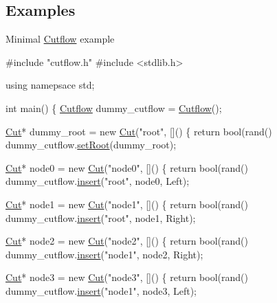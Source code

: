 \subsection*{Examples}


\begin{DoxyEnumerate}
\item Minimal \hyperlink{classCutflow}{Cutflow} example 
\begin{DoxyCode}
\textcolor{preprocessor}{#include "cutflow.h"}
\textcolor{preprocessor}{#include <stdlib.h>}

\textcolor{keyword}{using} namepsace std;

\textcolor{keywordtype}{int} main()
\{
    \hyperlink{classCutflow}{Cutflow} dummy\_cutflow = \hyperlink{classCutflow}{Cutflow}();

    \hyperlink{classCut}{Cut}* dummy\_root = \textcolor{keyword}{new} \hyperlink{classCut}{Cut}(\textcolor{stringliteral}{"root"}, []() \{ \textcolor{keywordflow}{return} bool(rand() %
    dummy\_cutflow.\hyperlink{classCutflow_ad27d37141c3748779a5d81fad919ecbb}{setRoot}(dummy\_root);

    \hyperlink{classCut}{Cut}* node0 = \textcolor{keyword}{new} \hyperlink{classCut}{Cut}(\textcolor{stringliteral}{"node0"}, []() \{ \textcolor{keywordflow}{return} bool(rand() %
    dummy\_cutflow.\hyperlink{classCutflow_a8da46f1053a6b97991489ee0920c29a1}{insert}(\textcolor{stringliteral}{"root"}, node0, Left);

    \hyperlink{classCut}{Cut}* node1 = \textcolor{keyword}{new} \hyperlink{classCut}{Cut}(\textcolor{stringliteral}{"node1"}, []() \{ \textcolor{keywordflow}{return} bool(rand() %
    dummy\_cutflow.\hyperlink{classCutflow_a8da46f1053a6b97991489ee0920c29a1}{insert}(\textcolor{stringliteral}{"root"}, node1, Right);

    \hyperlink{classCut}{Cut}* node2 = \textcolor{keyword}{new} \hyperlink{classCut}{Cut}(\textcolor{stringliteral}{"node2"}, []() \{ \textcolor{keywordflow}{return} bool(rand() %
    dummy\_cutflow.\hyperlink{classCutflow_a8da46f1053a6b97991489ee0920c29a1}{insert}(\textcolor{stringliteral}{"node1"}, node2, Right);

    \hyperlink{classCut}{Cut}* node3 = \textcolor{keyword}{new} \hyperlink{classCut}{Cut}(\textcolor{stringliteral}{"node3"}, []() \{ \textcolor{keywordflow}{return} bool(rand() %
    dummy\_cutflow.\hyperlink{classCutflow_a8da46f1053a6b97991489ee0920c29a1}{insert}(\textcolor{stringliteral}{"node1"}, node3, Left);


\end{DoxyCode}
\end{DoxyEnumerate}
